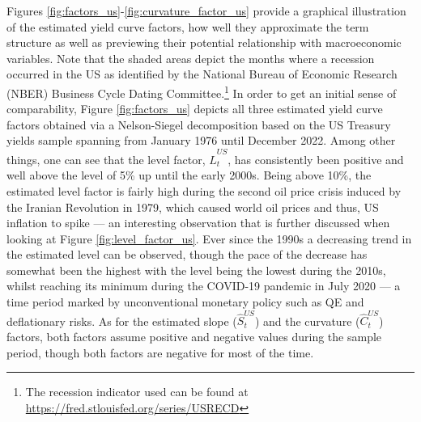 Figures \ref{fig:factors_us}-\ref{fig:curvature_factor_us} provide a graphical illustration of the estimated yield curve factors, how well they approximate the term structure as well as previewing their potential relationship with macroeconomic variables.
Note that the shaded areas depict the months where a recession occurred in the US as identified by the National Bureau of Economic Research (NBER) Business Cycle Dating Committee.\footnote{The recession indicator used can be found at \href{https://fred.stlouisfed.org/series/USRECD}{https://fred.stlouisfed.org/series/USRECD}}
In order to get an initial sense of comparability, Figure \ref{fig:factors_us} depicts all three estimated yield curve factors obtained via a Nelson-Siegel decomposition based on the US Treasury yields sample spanning from January 1976 until December 2022.
Among other things, one can see that the level factor, $\hat{L}^{US}_{t}$, has consistently been positive and well above the level of 5\% up until the early 2000s. 
Being above 10\%, the estimated level factor is fairly high during the second oil price crisis induced by the Iranian Revolution in 1979, which caused world oil prices and thus, US inflation to spike --- an interesting observation that is further discussed when looking at Figure \ref{fig:level_factor_us}. 
Ever since the 1990s a decreasing trend in the estimated level can be observed, though the pace of the decrease has somewhat been the highest with the level being the lowest during the 2010s, whilst reaching its minimum during the COVID-19 pandemic in July 2020 --- a time period marked by unconventional monetary policy such as QE and deflationary risks. 
As for the estimated slope ($\hat{S}^{US}_{t}$) and the curvature ($\hat{C}^{US}_{t}$) factors, both factors assume positive and negative values during the sample period, though both factors are negative for most of the time.

